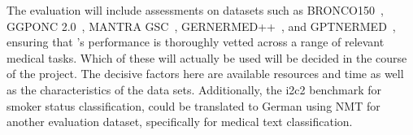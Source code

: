 The evaluation will include assessments on datasets such as
BRONCO150~\cite{kittner2021bronco150}, GGPONC 2.0~\cite{borchert2022ggponc},
MANTRA GSC~\cite{kors2015mantragsc}, GERNERMED++~\cite{frei2022gernermed}, and
GPTNERMED~\cite{frei2023gptnermed}, ensuring that \ChristBERT{}'s performance is
thoroughly vetted across a range of relevant medical tasks. Which of these will
actually be used will be decided in the course of the project. The decisive
factors here are available resources and time as well as the characteristics of
the data sets. Additionally, the i2c2 benchmark for smoker status
classification, could be translated to German using NMT for another evaluation
dataset, specifically for medical text classification.
